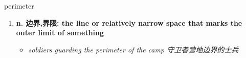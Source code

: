 
\begin{frame}
{\huge perimeter}
\begin{center}
\begin{enumerate}\Large
  \item \textbf{n. 边界,界限: the line or relatively narrow space that marks the outer limit of something}
  \begin{itemize}
    \item \em{\Large{soldiers guarding the perimeter of the camp 守卫者营地边界的士兵}}
  \end{itemize}
\end{enumerate}
\end{center}
\end{frame}
